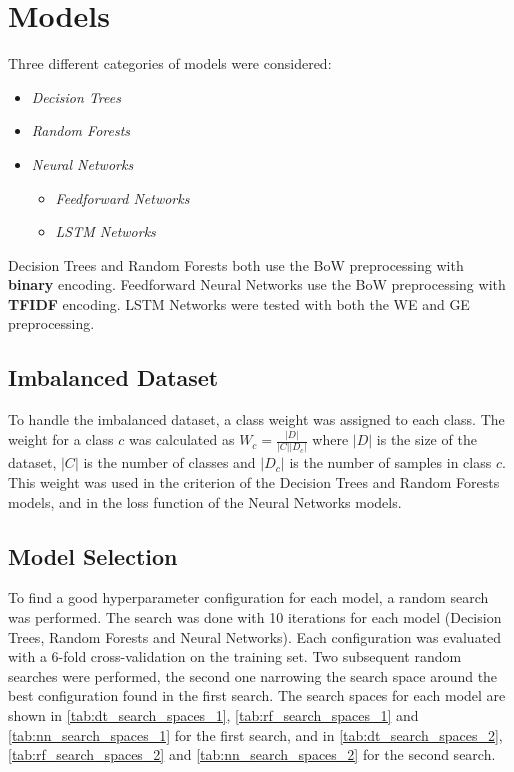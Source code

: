 \section{Models}
\label{sec:models}
Three different categories of models were
considered:
\begin{itemize}
    \item \textit{Decision Trees}
    \item \textit{Random Forests}
    \item \textit{Neural Networks}
    \begin{itemize}
        \item \textit{Feedforward Networks}
        \item \textit{LSTM Networks}
    \end{itemize}
\end{itemize}
Decision Trees and Random Forests both use
the BoW preprocessing with \textbf{binary} 
encoding.
Feedforward Neural Networks use the BoW
preprocessing with \textbf{TFIDF} encoding.
LSTM Networks were tested with both the
WE and GE preprocessing.

\subsection{Imbalanced Dataset}
To handle the imbalanced dataset, a class
weight was assigned to each class. The weight
for a class $c$ was calculated as
$W_c=\frac{|D|}{|C||D_c|}$ where $|D|$ is
the size of the dataset, $|C|$ is the number
of classes and $|D_c|$ is the number of
samples in class $c$. This weight was used in
the criterion of the Decision Trees and Random
Forests models, and in the loss function of
the Neural Networks models.

\subsection{Model Selection}
To find a good hyperparameter configuration
for each model, a random search was performed.
The search was done with 10 iterations for
each model (Decision Trees, Random Forests 
and Neural Networks). Each configuration was
evaluated with a 6-fold cross-validation on
the training set. Two subsequent random
searches were performed, the second one
narrowing the search space around the best
configuration found in the first search.
The search spaces for each model are shown
in \autoref{tab:dt_search_spaces_1}, 
\autoref{tab:rf_search_spaces_1} and 
\autoref{tab:nn_search_spaces_1} for the 
first search, and in 
\autoref{tab:dt_search_spaces_2},
\autoref{tab:rf_search_spaces_2} and
\autoref{tab:nn_search_spaces_2} for the
second search.

